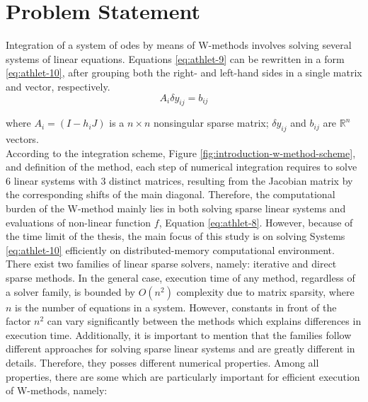 \chapter{Problem Statement}\label{chapter:problem-statment}


Integration of a system of \acrshort{ode}s by means of W-methods involves solving  several systems of linear equations. Equations \ref{eq:athlet-9} can be rewritten in a form \ref{eq:athlet-10}, after grouping both the right- and left-hand sides in a single matrix and vector, respectively.\\



\begin{equation} \label{eq:athlet-10}
	A_{i} \delta y_{ij} =  b_{ij} 
\end{equation}


where $A_{i} = (I - h_{i}J)$  is a $n \times n$ nonsingular sparse matrix; $\delta y_{ij}$  and $b_{ij}$ are $\mathbb{R}^{n}$ vectors.\\


According to the integration scheme, Figure \ref{fig:introduction-w-method-scheme}, and definition of the method, each step of numerical integration requires to solve 6 linear systems with 3 distinct matrices, resulting from the Jacobian matrix by the corresponding shifts of the main diagonal. Therefore, the computational burden of the W-method mainly lies in both solving sparse linear systems and evaluations of non-linear function $f$, Equation \ref{eq:athlet-8}. However, because of the time limit of the thesis, the main focus of this study is on solving Systems \ref{eq:athlet-10} efficiently on distributed-memory computational environment.\\


There exist two families of linear sparse solvers, namely: iterative and direct sparse methods. In the general case, execution time of any method, regardless of a solver family, is bounded by $O(n^2)$ complexity due to matrix sparsity, where $n$ is the number of equations in a system. However, constants in front of the factor $n^2$ can vary significantly between the methods which explains differences in execution time. Additionally, it is important to mention that the families follow different approaches for solving sparse linear systems and are greatly different in details. Therefore, they posses different numerical properties. Among all  properties, there are some which are particularly important for efficient execution of W-methods, namely: \\


